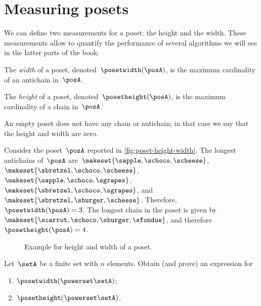 \section{Measuring posets}
We can define two measurements for a poset: the height and the width.
These measurements allow to quantify the performance of several algorithms we will see in the latter parts of the book.
\begin{definition}
    \label{def:poset-width}
    The \emph{width} of a poset, denoted~$\posetwidth(\posA)$, is the maximum cardinality of an antichain in~$\posA$.
\end{definition}

\begin{definition}
    \label{def:poset-height}
    The \emph{height} of a poset, denoted~$\posetheight(\posA)$, is the maximum cardinality of a chain in~$\posA$.
\end{definition}

An empty poset does not have any chain or antichain; in that case we say that the height and width are zero.

\begin{example}
    Consider the poset~$\posA$ reported in \cref{fig:poset-height-width}.
    The longest antichains of~$\posA$ are~$\makeset{\sapple, \schoco, \scheese}$,~$\makeset{\sbretzel, \schoco, \scheese}$,~$\makeset{\sapple, \schoco, \sgrapes}$,~$\makeset{\sbretzel, \schoco, \sgrapes}$, and~$\makeset{\sbretzel, \sburger, \scheese}$.
    Therefore,~$\posetwidth(\posA)=3$.
    The longest chain in the poset is given by~$\makeset{\scarrot,\schoco,\sburger,\sfondue}$, and therefore~$\posetheight(\posA)=4$.
\end{example}

\begin{figure*}[h]
    \caption{Example for height and width of a poset.
    }
\end{figure*}

\vfill
\begin{gradedexercise}
    \label{ex:MeasurePowerPoset}

    Let~$\setA$ be a finite set with $n$ elements.
    Obtain (and prove) an expression for
    \begin{enumerate}
        \item $\posetwidth(\powerset  \setA)$;
        \item $\posetheight(\powerset \setA)$.
    \end{enumerate}
\end{gradedexercise}

